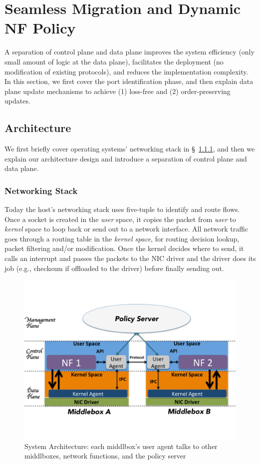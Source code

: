  
 \section{Seamless Migration and Dynamic NF Policy}

A separation of control plane and data plane improves the system efficiency (only small amount of logic at the data plane), facilitates the deployment (no modification of existing protocols), and reduces the implementation complexity. In this section, we first cover the port identification phase, and then explain data plane update mechanisms to achieve (1) loss-free and (2) order-preserving updates. 

\subsection{Architecture}


We first briefly cover operating systems' networking stack in \S~\ref{nks}, and then we explain our architecture design and introduce a separation of control plane and data plane. 

\subsubsection{Networking Stack} \label{nks}
Today the host's networking stack uses five-tuple to identify and route flows. Once a socket is created in the \textit{user} space, it copies the packet from \textit{user} to \textit{kernel} space to loop back or send out to a network interface. All network traffic goes through a routing table in the \textit{kernel space}, for routing decision lookup, packet filtering and/or modification. Once the kernel decides where to send, it calls an interrupt and passes the packets to the NIC driver and the driver does its job (e.g., checksum if offloaded to the driver) before finally sending out.

\begin{figure}[ht]
\centering
\includegraphics[width=\linewidth]{figures/architecture.pdf} 

\caption{\small System Architecture: each middlbox's user agent talks to other middlboxes, network functions, and the policy server}\label{netf}
\end{figure}

